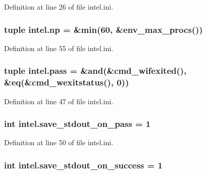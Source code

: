 Definition at line 26 of file intel.\-ini.

\hypertarget{namespaceintel_a558dbc0148f5b13814f44a2d26dd4dd3}{
\subsubsection[{np}]{\setlength{\rightskip}{0pt plus 5cm}tuple intel.\-np = \&min(60, \&env\-\_\-max\-\_\-procs())}}\label{namespaceintel_a558dbc0148f5b13814f44a2d26dd4dd3}


Definition at line 55 of file intel.\-ini.

\hypertarget{namespaceintel_abe7eb5e3e0f0e655ca871399725225ec}{
\subsubsection[{pass}]{\setlength{\rightskip}{0pt plus 5cm}tuple intel.\-pass = \&and(\&cmd\-\_\-wifexited(), \&eq(\&cmd\-\_\-wexitstatus(), 0))}}\label{namespaceintel_abe7eb5e3e0f0e655ca871399725225ec}


Definition at line 47 of file intel.\-ini.

\hypertarget{namespaceintel_a842390e7e793fca2c69572646d19a7c2}{
\subsubsection[{save\-\_\-stdout\-\_\-on\-\_\-pass}]{\setlength{\rightskip}{0pt plus 5cm}int intel.\-save\-\_\-stdout\-\_\-on\-\_\-pass = 1}}\label{namespaceintel_a842390e7e793fca2c69572646d19a7c2}


Definition at line 50 of file intel.\-ini.

\hypertarget{namespaceintel_aae23293ca49af13cfb800e28cb67a86b}{
\subsubsection[{save\-\_\-stdout\-\_\-on\-\_\-success}]{\setlength{\rightskip}{0pt plus 5cm}int intel.\-save\-\_\-stdout\-\_\-on\-\_\-success = 1}}\label{namespaceintel_aae23293ca49af13cfb800e28cb67a86b}


